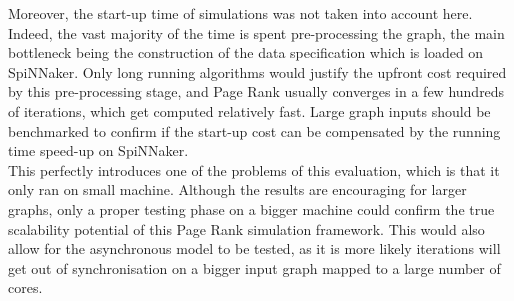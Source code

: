 Moreover, the start-up time of simulations was not taken into account here. Indeed, the vast majority of the time is spent pre-processing the graph, the main bottleneck being the construction of the data specification which is loaded on SpiNNaker. Only long running algorithms would justify the upfront cost required by this pre-processing stage, and Page Rank usually converges in a few hundreds of iterations, which get computed relatively fast. Large graph inputs should be benchmarked to confirm if the start-up cost can be compensated by the running time speed-up on SpiNNaker. \\

This perfectly introduces one of the problems of this evaluation, which is that it only ran on small machine. Although the results are encouraging for larger graphs, only a proper testing phase on a bigger machine could confirm the true scalability potential of this Page Rank simulation framework. This would also allow for the asynchronous model to be tested, as it is more likely iterations will get out of synchronisation on a bigger input graph mapped to a large number of cores.

%
%
%

